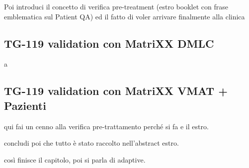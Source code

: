 Poi introduci il concetto di verifica pre-treatment (estro booklet con frase emblematica sul Patient QA) ed il fatto di voler arrivare finalmente alla clinica

\subsection{TG-119 validation con MatriXX DMLC}
a
\subsection{TG-119 validation con MatriXX VMAT + Pazienti}
qui fai un cenno alla verifica pre-trattamento perché si fa e il 
 estro.

concludi poi che tutto è stato raccolto nell'abstract estro.

così finisce il capitolo, poi si parla di adaptive.
















